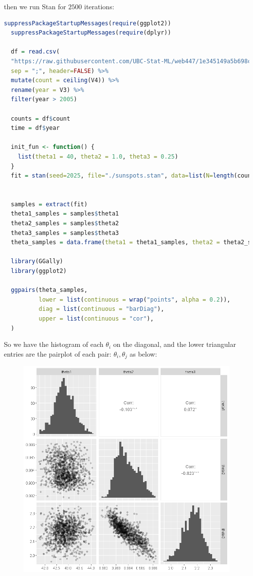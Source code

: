 \documentclass{article}
\begin{document}
then we run Stan for $2500$ iterations:
\begin{lstlisting}[language=R]
  suppressPackageStartupMessages(require(ggplot2))
  suppressPackageStartupMessages(require(dplyr))

  df = read.csv(
  "https://raw.githubusercontent.com/UBC-Stat-ML/web447/1e345149a5b698ccdf0a7e9b0aeabec2463c50ca/data/sunspots-SN_m_tot_V2.0.csv",
  sep = ";", header=FALSE) %>%
  mutate(count = ceiling(V4)) %>%
  rename(year = V3) %>%
  filter(year > 2005)

  counts = df$count 
  time = df$year

  init_fun <- function() {
    list(theta1 = 40, theta2 = 1.0, theta3 = 0.25)
  }
  fit = stan(seed=2025, file="./sunspots.stan", data=list(N=length(counts),y=counts), chains=1, iter=2500, init = init_fun)


  samples = extract(fit)
  theta1_samples = samples$theta1
  theta2_samples = samples$theta2
  theta3_samples = samples$theta3
  theta_samples = data.frame(theta1 = theta1_samples, theta2 = theta2_samples, theta3 = theta3_samples)

  library(GGally)
  library(ggplot2)

  ggpairs(theta_samples, 
          lower = list(continuous = wrap("points", alpha = 0.2)),
          diag = list(continuous = "barDiag"),
          upper = list(continuous = "cor"),
  )
\end{lstlisting}
So we have the histogram of each $\theta_i$ on the diagonal, and the lower triangular entries are the pairplot of each pair: $\theta_i, \theta_j$ as below:
\begin{figure}[H]
  \centering
  \includegraphics[width=\textwidth]{pairplot.png}
  \caption{}
  \label{}
\end{figure}
\end{document}
